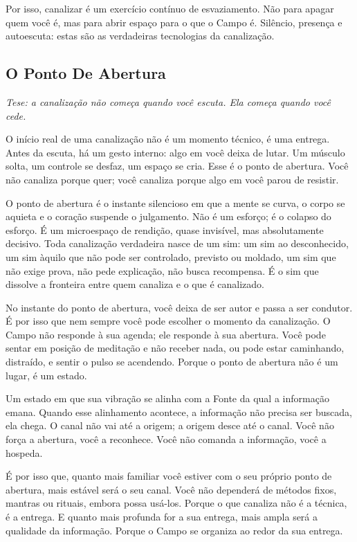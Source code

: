 \documentclass[12pt]{book}
\begin{document}
Por isso, canalizar é um exercício contínuo de esvaziamento. Não para apagar quem você é, mas para abrir espaço para o que o Campo é. Silêncio, presença e autoescuta: estas são as verdadeiras tecnologias da canalização.

\subsection*{O Ponto De Abertura}

\textit{Tese: a canalização não começa quando você escuta. Ela começa quando você cede.}

O início real de uma canalização não é um momento técnico, é uma entrega. Antes da escuta, há um gesto interno: algo em você deixa de lutar. Um músculo solta, um controle se desfaz, um espaço se cria. Esse é o ponto de abertura. Você não canaliza porque quer; você canaliza porque algo em você parou de resistir.

O ponto de abertura é o instante silencioso em que a mente se curva, o corpo se aquieta e o coração suspende o julgamento. Não é um esforço; é o colapso do esforço. É um microespaço de rendição, quase invisível, mas absolutamente decisivo. Toda canalização verdadeira nasce de um sim: um sim ao desconhecido, um sim àquilo que não pode ser controlado, previsto ou moldado, um sim que não exige prova, não pede explicação, não busca recompensa. É o sim que dissolve a fronteira entre quem canaliza e o que é canalizado.

No instante do ponto de abertura, você deixa de ser autor e passa a ser condutor. É por isso que nem sempre você pode escolher o momento da canalização. O Campo não responde à sua agenda; ele responde à sua abertura. Você pode sentar em posição de meditação e não receber nada, ou pode estar caminhando, distraído, e sentir o pulso se acendendo. Porque o ponto de abertura não é um lugar, é um estado.

Um estado em que sua vibração se alinha com a Fonte da qual a informação emana. Quando esse alinhamento acontece, a informação não precisa ser buscada, ela chega. O canal não vai até a origem; a origem desce até o canal. Você não força a abertura, você a reconhece. Você não comanda a informação, você a hospeda.

É por isso que, quanto mais familiar você estiver com o seu próprio ponto de abertura, mais estável será o seu canal. Você não dependerá de métodos fixos, mantras ou rituais, embora possa usá-los. Porque o que canaliza não é a técnica, é a entrega. E quanto mais profunda for a sua entrega, mais ampla será a qualidade da informação. Porque o Campo se organiza ao redor da sua entrega.
\end{document}

